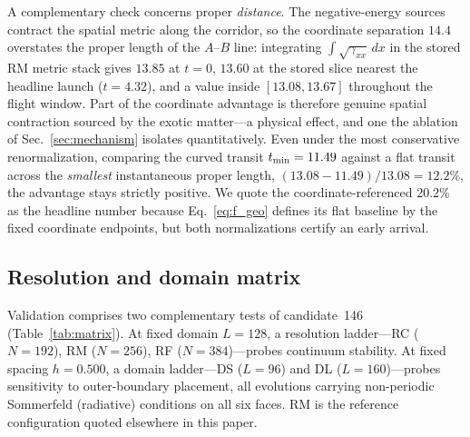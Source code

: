 \documentclass[twocolumn,floatfix,aps,prd,nofootinbib]{revtex4-2}
\begin{document}
A complementary check concerns proper \emph{distance}. The negative-energy
sources contract the spatial metric along the corridor, so the coordinate
separation $14.4$ overstates the proper length of the $A$--$B$ line:
integrating $\int\sqrt{\gamma_{xx}}\,dx$ in the stored RM metric stack gives
$13.85$ at $t=0$, $13.60$ at the stored slice nearest the headline launch
($t=4.32$), and a value inside $[13.08,13.67]$ throughout the flight window.
Part of the coordinate advantage is therefore genuine spatial contraction
sourced by the exotic matter---a physical effect, and one the ablation of
Sec.~\ref{sec:mechanism} isolates quantitatively. Even under the most
conservative renormalization, comparing the curved transit $t_{\rm min}=11.49$
against a flat transit across the \emph{smallest} instantaneous proper length,
$(13.08-11.49)/13.08=12.2\%$, the advantage stays strictly positive. We
quote the coordinate-referenced $20.2\%$ as the headline number because
Eq.~\eqref{eq:f_geo} defines its flat baseline by the fixed coordinate
endpoints, but both normalizations certify an early arrival.

\subsection{Resolution and domain matrix}

Validation comprises two complementary tests of candidate~146
(Table~\ref{tab:matrix}). At fixed domain $L=128$, a resolution
ladder---RC ($N=192$), RM ($N=256$), RF ($N=384$)---probes continuum
stability. At fixed spacing $h=0.500$, a domain ladder---DS ($L=96$) and DL
($L=160$)---probes sensitivity to outer-boundary placement, all evolutions
carrying non-periodic Sommerfeld (radiative) conditions on all six faces. RM
is the reference configuration quoted elsewhere in this paper.
\end{document}
